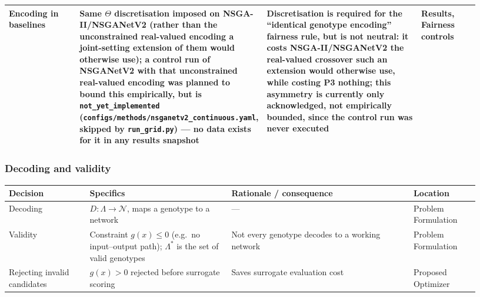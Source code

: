 \begin{longtable}{p{0.16\linewidth} p{0.28\linewidth} p{0.36\linewidth} p{0.13\linewidth}}
Encoding in baselines & Same $\Theta$ discretisation imposed on NSGA-II/NSGANetV2 (rather than the unconstrained real-valued encoding a joint-setting extension of them would otherwise use); a control run of NSGANetV2 with that unconstrained real-valued encoding was planned to bound this empirically, but is \texttt{not\_yet\_implemented} (\texttt{configs/methods/nsganetv2\_continuous.yaml}, skipped by \texttt{run\_grid.py}) --- no data exists for it in any results snapshot & Discretisation is required for the ``identical genotype encoding'' fairness rule, but is not neutral: it costs NSGA-II/NSGANetV2 the real-valued crossover such an extension would otherwise use, while costing P3 nothing; this asymmetry is currently only acknowledged, not empirically bounded, since the control run was never executed & Results, Fairness controls \\
\bottomrule
\end{longtable}

\subsubsection*{Decoding and validity}
\begin{longtable}{p{0.16\linewidth} p{0.28\linewidth} p{0.36\linewidth} p{0.13\linewidth}}
\toprule
\textbf{Decision} & \textbf{Specifics} & \textbf{Rationale / consequence} & \textbf{Location} \\
\midrule
\endhead
Decoding & $D:\Lambda\to\mathcal{N}$, maps a genotype to a network & --- & Problem Formulation \\
Validity & Constraint $g(x)\le 0$ (e.g.\ no input--output path); $\Lambda^*$ is the set of valid genotypes & Not every genotype decodes to a working network & Problem Formulation \\
Rejecting invalid candidates & $g(x)>0$ rejected before surrogate scoring & Saves surrogate evaluation cost & Proposed Optimizer \\
\bottomrule
\end{longtable}

